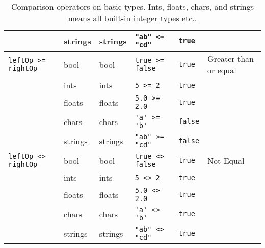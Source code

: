 \begin{table}[ht]
\begin{tabularx}{\linewidth}{|l|l|l|l|l|X|}
             &strings & strings & \lstinline!"ab" <= "cd"!&\lstinline!true!&\\
    \hline
    \lstinline!leftOp >= rightOp!&bool & bool & \lstinline!true >= false!&\lstinline!true!&Greater than or equal\\
             &ints & ints & \lstinline!5 >= 2!&\lstinline!true!&\\
             &floats & floats & \lstinline!5.0 >= 2.0!&\lstinline!true!&\\
             &chars & chars & \lstinline!'a' >= 'b'!&\lstinline!false!&\\
             &strings & strings & \lstinline!"ab" >= "cd"!&\lstinline!false!&\\
    \hline
    \lstinline!leftOp <> rightOp!&bool & bool & \lstinline!true <> false!&\lstinline!true!&Not Equal\\
             &ints & ints & \lstinline!5 <> 2!&\lstinline!true!&\\
             &floats & floats & \lstinline!5.0 <> 2.0!&\lstinline!true!&\\
             &chars & chars & \lstinline!'a' <> 'b'!&\lstinline!true!&\\
             &strings & strings & \lstinline!"ab" <> "cd"!&\lstinline!true!&\\
    \hline
  \end{tabularx}
  \caption{Comparison operators on basic types. Ints, floats, chars, and strings means all built-in integer types etc..}
  \label{tab:comparisonOperators}
\end{table}
\clearpage

